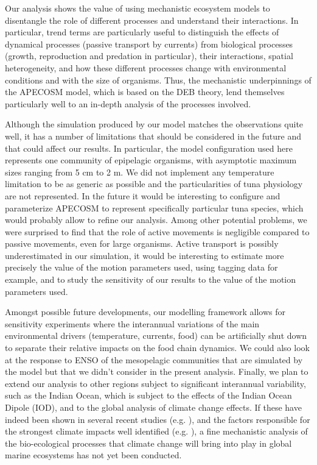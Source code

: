 Our analysis shows the value of using mechanistic ecosystem models to disentangle the role of different processes and understand their interactions. In particular, trend terms are particularly useful to distinguish the effects of dynamical processes (passive transport by currents) from biological processes (growth, reproduction and predation in particular), their interactions, spatial heterogeneity, and how these different processes change with environmental conditions and with the size of organisms. Thus, the mechanistic underpinnings of the APECOSM model, which is based on the DEB theory, lend themselves particularly well to an in-depth analysis of the processes involved.

Although the simulation produced by our model matches the observations quite well, it has a number of limitations that should be considered in the future and that could affect our results. In particular, the model configuration used here represents one community of epipelagic organisms, with asymptotic maximum sizes ranging from 5 cm to 2 m. We did not implement any temperature limitation to be as generic as possible and the particularities of tuna physiology are not represented. In the future it would be interesting to configure and parameterize APECOSM to represent specifically particular tuna species, which would probably allow to refine our analysis. Among other potential problems, we were surprised to find that the role of active movements is negligible compared to passive movements, even for large organisms. Active transport is possibly underestimated in our simulation, it would be interesting to estimate more precisely the value of the motion parameters used, using tagging data for example, and to study the sensitivity of our results to the value of the motion parameters used.

Amongst possible future developments, our modelling framework allows for sensitivity experiments where the interannual variations of the main environmental drivers (temperature, currents, food) can be artificially shut down to separate their relative impacts on the food chain dynamics. We could also look at the response to ENSO of the mesopelagic communities that are simulated by the model but that we didn't consider in the present analysis. Finally, we plan to extend our analysis to other regions subject to significant interannual variability, such as the Indian Ocean, which is subject to the effects of the Indian Ocean Dipole (IOD), and to the global analysis of climate change effects. If these have indeed been shown in several recent studies (e.g. \citealp{lotzeGlobalEnsembleProjections2019, tittensorNextgenerationEnsembleProjections2021}), and the factors responsible for the strongest climate impacts well identified (e.g. \citealp{heneghanDisentanglingDiverseResponses2021}), a fine mechanistic analysis of the bio-ecological processes that climate change will bring into play in global marine ecosystems has not yet been conducted.

